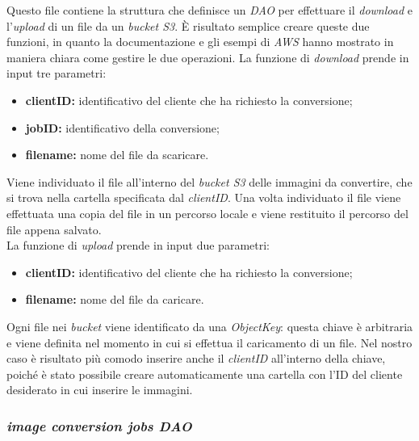 Questo file contiene la struttura che definisce un \emph{DAO} per effettuare il
\emph{download} e l'\emph{upload} di un file da un \emph{bucket S3}. È risultato
semplice creare queste due funzioni, in quanto la documentazione e gli esempi di
\emph{AWS} hanno mostrato in maniera chiara come gestire le due operazioni. La funzione
di \emph{download} prende in input tre parametri:
\begin{itemize}
      \item \textbf{clientID:} identificativo del cliente che ha richiesto la
            conversione;
      \item \textbf{jobID:} identificativo della conversione;
      \item \textbf{filename:} nome del file da scaricare.
\end{itemize}

Viene individuato il file all'interno del \emph{bucket S3} delle immagini da convertire, che si trova nella
cartella specificata dal \emph{clientID}. Una volta individuato il file viene effettuata una
copia del file in un percorso locale e viene restituito il percorso del file
appena salvato.\\

La funzione di \emph{upload} prende in input due parametri:
\begin{itemize}
      \item \textbf{clientID:} identificativo del cliente che ha richiesto la
            conversione;
      \item \textbf{filename:} nome del file da caricare.
\end{itemize}
Ogni file nei \emph{bucket} viene
identificato da una \emph{ObjectKey}: questa chiave è arbitraria e viene
definita nel momento in cui si effettua il caricamento di un file. Nel nostro
caso è risultato più comodo inserire anche il \emph{clientID} all'interno della chiave,
poiché è stato possibile creare automaticamente una cartella con l'ID del cliente desiderato
in cui inserire le immagini. \\

\subsubsection{\emph{image conversion jobs DAO}}

